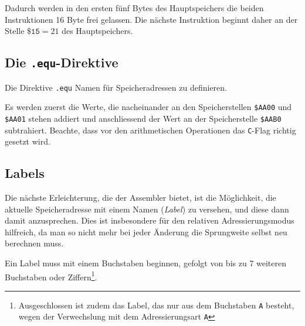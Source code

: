 \documentclass[11pt]{scrartcl}
\newcommand{\acc}{\texttt{A}}
\newcommand{\hex}[1]{\texttt{\$#1}}
\begin{document}
\begin{center}
  
\end{center}

Dadurch werden in den ersten fünf Bytes des Hauptspeichers die beiden
Instruktionen 16 Byte frei gelassen. Die nächste Instruktion beginnt
daher an der Stelle $\hex{15}=21$ des Hauptspeichers.


\subsection{Die \lstinline!.equ!-Direktive}
\label{sec:equ_directive}

Die Direktive \lstinline!.equ! Namen für Speicheradressen zu
definieren.

\begin{center}
  
\end{center}

Es werden zuerst die Werte, die nacheinander an den Speicherstellen
\hex{AA00} und \hex{AA01} stehen addiert und anschliessend der Wert an
der Speicherstelle \hex{AAB0} subtrahiert. Beachte, dass vor den
arithmetischen Operationen das \lstinline|C|-Flag richtig gesetzt
wird.




\subsection{Labels}
\label{sec:ass_labels}

Die nächste Erleichterung, die der Assembler bietet, ist die
Möglichkeit, die aktuelle Speicheradresse mit einem Namen
(\emph{Label}) zu versehen, und diese dann damit anzusprechen.
Dies ist insbesondere für den relativen Adressierungsmodus hilfreich,
da man so nicht mehr bei jeder Änderung die Sprungweite selbst neu
berechnen muss. 

Ein Label muss mit einem Buchstaben beginnen, gefolgt von bis zu 7
weiteren Buchstaben oder Ziffern\footnote{Ausgeschlossen ist zudem das
  Label, das nur aus dem Buchstaben \lstinline!A! besteht, wegen der
  Verwechslung mit dem Adressierungsart \acc}.

\begin{center}
  
\end{center}
\end{document}
